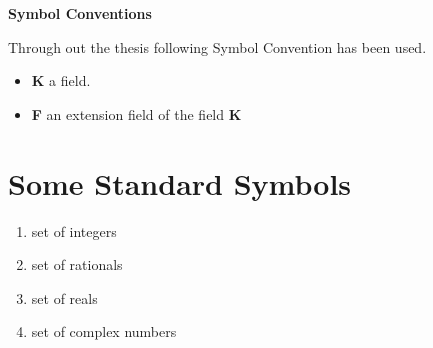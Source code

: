
\hspace{-7mm}
  {\LARGE {\bfseries {Symbol Conventions}}}

  \vspace{7mm}

Through out the thesis following Symbol Convention has been used.\\[4mm]

\begin{itemize}
\item \textbf{K} \hspace{5mm} a field.
\item \textbf{F} \hspace{5mm} an extension field of the field \textbf{K}
\end{itemize}

\section*{Some Standard Symbols}
\begin{enumerate}
\item {} \hspace{5mm} set of integers
\item {} \hspace{5mm} set of rationals
\item {} \hspace{5mm} set of reals
\item {} \hspace{5mm} set of complex numbers
\end{enumerate}
